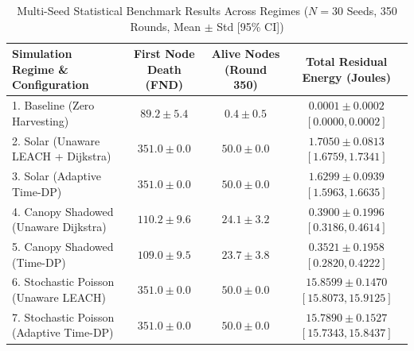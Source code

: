 \documentclass[journal]{IEEEtran}
\begin{document}
\begin{table}[!t]
\caption{Multi-Seed Statistical Benchmark Results Across Regimes ($N = 30$ Seeds, 350 Rounds, Mean $\pm$ Std [95\% CI])}
\label{tab:multi_seed}
\centering
\begin{tabular}{@{}lccc@{}}
\toprule
\textbf{Simulation Regime \& Configuration} & \textbf{First Node Death (FND)} & \textbf{Alive Nodes (Round 350)} & \textbf{Total Residual Energy (Joules)} \\
\midrule
1. Baseline (Zero Harvesting) & $89.2 \pm 5.4$ & $0.4 \pm 0.5$ & $0.0001 \pm 0.0002$ $[0.0000, 0.0002]$ \\
2. Solar (Unaware LEACH + Dijkstra) & $351.0 \pm 0.0$ & $50.0 \pm 0.0$ & $\mathbf{1.7050 \pm 0.0813}$ $[1.6759, 1.7341]$ \\
3. Solar (Adaptive Time-DP) & $351.0 \pm 0.0$ & $50.0 \pm 0.0$ & $1.6299 \pm 0.0939$ $[1.5963, 1.6635]$ \\
4. Canopy Shadowed (Unaware Dijkstra) & $\mathbf{110.2 \pm 9.6}$ & $\mathbf{24.1 \pm 3.2}$ & $\mathbf{0.3900 \pm 0.1996}$ $[0.3186, 0.4614]$ \\
5. Canopy Shadowed (Time-DP) & $109.0 \pm 9.5$ & $23.7 \pm 3.8$ & $0.3521 \pm 0.1958$ $[0.2820, 0.4222]$ \\
6. Stochastic Poisson (Unaware LEACH) & $351.0 \pm 0.0$ & $50.0 \pm 0.0$ & $\mathbf{15.8599 \pm 0.1470}$ $[15.8073, 15.9125]$ \\
7. Stochastic Poisson (Adaptive Time-DP) & $351.0 \pm 0.0$ & $50.0 \pm 0.0$ & $15.7890 \pm 0.1527$ $[15.7343, 15.8437]$ \\
\bottomrule
\end{tabular}
\end{table}
\end{document}
